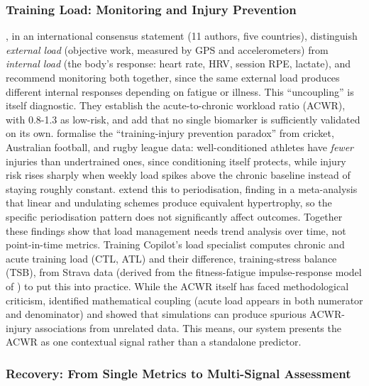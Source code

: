 \subsubsection{Training Load: Monitoring and Injury Prevention}

\cite{bourdon_monitoring_2017}, in an international consensus statement (11 authors, five countries), distinguish \textit{external load} (objective work, measured by GPS and accelerometers) from \textit{internal load} (the body's response: heart rate, HRV, session RPE, lactate), and recommend monitoring both together, since the same external load produces different internal responses depending on fatigue or illness. This ``uncoupling'' is itself diagnostic. They establish the acute-to-chronic workload ratio (ACWR), with 0.8-1.3 as low-risk, and \cite{halson_monitoring_2014} add that no single biomarker is sufficiently validated on its own. \cite{gabbett_training_2016} formalise the ``training-injury prevention paradox'' from cricket, Australian football, and rugby league data: well-conditioned athletes have \textit{fewer} injuries than undertrained ones, since conditioning itself protects, while injury risk rises sharply when weekly load spikes above the chronic baseline instead of staying roughly constant. \cite{grgic_periodization_2017} extend this to periodisation, finding in a meta-analysis that linear and undulating schemes produce equivalent hypertrophy, so the specific periodisation pattern does not significantly affect outcomes. Together these findings show that load management needs trend analysis over time, not point-in-time metrics. Training Copilot's load specialist computes chronic and acute training load (CTL, ATL) and their difference, training-stress balance (TSB), from Strava data (derived from the fitness-fatigue impulse-response model of \cite{morton_modeling_1990}) to put this into practice. While the ACWR itself has faced methodological criticism, \cite{impellizzeri_training_2020} identified mathematical coupling (acute load appears in both numerator and denominator) and showed that simulations can produce spurious ACWR-injury associations from unrelated data. This means, our system presents the ACWR as one contextual signal rather than a standalone predictor.

\subsubsection{Recovery: From Single Metrics to Multi-Signal Assessment}

